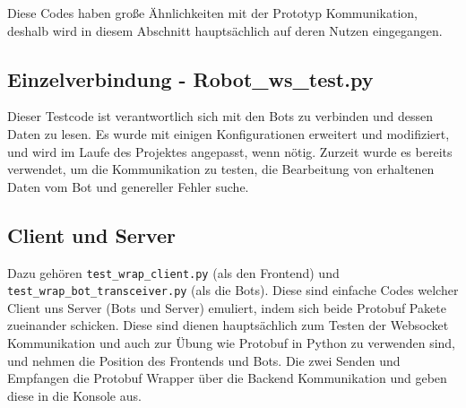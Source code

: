 Diese Codes haben große Ähnlichkeiten mit der Prototyp Kommunikation, 
deshalb wird in diesem Abschnitt hauptsächlich auf deren Nutzen eingegangen.

\subsection{Einzelverbindung - Robot\_ws\_test.py}
Dieser Testcode ist verantwortlich sich mit den Bots zu verbinden 
und dessen Daten zu lesen.
Es wurde mit einigen Konfigurationen erweitert und modifiziert, 
und wird im Laufe des Projektes angepasst, wenn nötig.
Zurzeit wurde es bereits verwendet, um die Kommunikation zu testen, 
die Bearbeitung von erhaltenen Daten vom Bot und genereller Fehler suche.

\subsection{Client und Server}
Dazu gehören \texttt{test\_wrap\_client.py} (als den Frontend) 
und \texttt{test\_wrap\_bot\_transceiver.py} (als die Bots).
Diese sind einfache Codes welcher Client uns Server (Bots und Server) emuliert, 
indem sich beide Protobuf Pakete zueinander schicken. 
Diese sind dienen hauptsächlich zum Testen der Websocket Kommunikation 
und auch zur Übung wie Protobuf in Python zu verwenden sind, 
und nehmen die Position des Frontends und Bots.
Die zwei Senden und Empfangen die Protobuf Wrapper über die Backend Kommunikation 
und geben diese in die Konsole aus.
